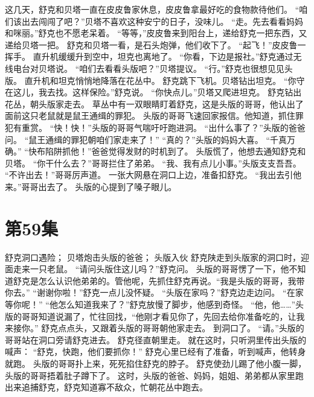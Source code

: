 \documentclass[a4paper,12pt,UTF8,twoside]{ctexbook}
\begin{document}
        这几天，舒克和贝塔一直在皮皮鲁家休息，皮皮鲁拿最好吃的食物款待他们。 
        “咱们该出去闯闯了吧？”贝塔不喜欢这种安宁的日子，没味儿。 
        “走。先去看看妈妈和咪丽。”舒克也不愿老呆着。 
        “等等，”皮皮鲁来到阳台上，递给舒克一把东西，又递给贝塔一把。 
        舒克和贝塔一看，是石头炮弹，他们收下了。 
        “起飞！”皮皮鲁一挥手。 
        直升机缓缓升到空中，坦克也离地了。 
        “你看，下边是报社。”舒克通过无线电台对贝塔说。 
        “咱们去看看头版吧？”贝塔提议。 
        “行。”舒克也很想见见头版。 
        直升机和坦克悄悄地降落在花丛中。 
        舒克跳下飞机。贝塔钻出坦克。 
        “你守在这儿，我去找。这样保险。”舒克说。 
        “你快点儿。”贝塔又爬进坦克。 
        舒克钻出花丛，朝头版家走去。 
        草丛中有一双眼睛盯着舒克，这是头版的哥哥，他认出了面前这只老鼠就是鼠王通缉的罪犯。 
        头版的哥哥飞速回家报信。他知道，抓住罪犯有重赏。 
        “快！快！”头版的哥哥气喘吁吁跑进洞。 
        “出什么事了？”头版的爸爸问。 
        “鼠王通缉的罪犯朝咱们家走来了！” 
        “真的？”头版的妈妈大喜。 
        “千真万确。” 
        “快布陷阱抓他！”爸爸觉得发财的时机到了。 
        头版慌了，他想去通知舒克和贝塔。 
        “你干什么去？”哥哥拦住了弟弟。 
        “我、我有点儿小事。”头版支支吾吾。 
        “不许出去！”哥哥厉声道。 
        一张大网悬在洞口上边，准备扣舒克。 
        “我出去引他来。”哥哥出去了。 
        头版的心提到了嗓子眼儿。   \chapter{第59集} 
        舒克洞口遇险； 
        贝塔炮击头版的爸爸； 
        头版入伙   
        舒克陕走到头版家的洞口时，迎面走来一只老鼠。 
        “请问头版住这儿吗？”舒克问。 
        头版的哥哥愣了一下，他不知道舒克是怎么认识他弟弟的。管他呢，先抓住舒克再说。“我是头版的哥哥，我带你去。” 
        “谢谢你啦！”舒克一点儿没怀疑。 
        “头版在家吗？”舒克边走边问。 
        “在家等你呢！” 
        “他怎么知道我来了？”舒克放慢了脚步，他感到奇怪。 
        “他，他……”头版的哥哥知道说漏了，忙往回找，“他刚才看见你了，先回去给你准备吃的，让我来接你。” 
        舒克点点头，又跟着头版的哥哥朝他家走去。 
        到洞口了。 
        “请。”头版的哥哥站在洞口旁请舒克进去。 
        舒克径直朝里走。 
        就在这时，只听洞里传出头版的喊声： 
        “舒克，快跑，他们要抓你！” 
        舒克心里已经有了准备，听到喊声，他转身就跑。 
        头版的哥哥扑上来，死死掐住舒克的脖子。 
        舒克使劲儿踢了他小腹一脚，头版的哥哥捂着肚子蹲下了。 
        这时，头版的爸爸、妈妈，姐姐、弟弟都从家里跑出来追捕舒克，舒克知道寡不敌众，忙朝花丛中跑去。 
\end{document}
